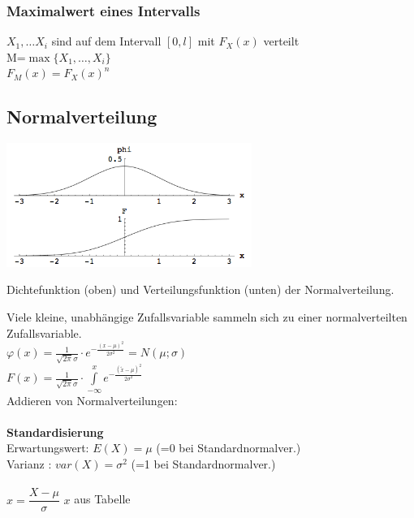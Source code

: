         \subsubsection{Maximalwert eines Intervalls }
		$X_1,\ldots X_i$ sind auf dem Intervall $[0,l]$ mit $F_X(x)$ verteilt\\
		M=$\max \{ X_1,\ldots,X_i\} $ \\
		$F_M(x)=F_X(x)^n$ \\

\newpage

	\subsection{Normalverteilung }
		\begin{floatingfigure}[r]{8cm}
		\includegraphics[width=8cm]{./bilder/normalverteilung.png}
		\caption{Dichtefunktion (oben) und Verteilungsfunktion (unten) der
		Normalverteilung.}
   		\end{floatingfigure}
		Viele kleine, unabhängige Zufallsvariable sammeln sich zu einer
		normalverteilten Zufallsvariable.\\
		 $\varphi(x)=\frac{1}{\sqrt{2
		\pi}\sigma}\cdot e^{-\frac{(x-\mu)^2}{2\sigma^2}} = N(\mu ; \sigma) $\\ 
		$F(x)=\frac{1}{\sqrt{2
		\pi}\sigma}\cdot \int\limits^{x}_{-\infty}{e^{-\frac{(\tilde{x} -\mu)^2}{2\sigma^2}}} $ \\
		Addieren von Normalverteilungen: \\
		 \\
		\textbf{Standardisierung}\\ Erwartungswert: $E(X)=\mu$ \hspace{4mm}(=0 bei Standardnormalver.)\\ 
		Varianz \hspace{11.5mm}: $var(X)=\sigma^2$ (=1 bei Standardnormalver.)\\ \\
		$x=\dfrac{X-\mu}{\sigma}$ \hspace{5mm} $x$ aus Tabelle
 
